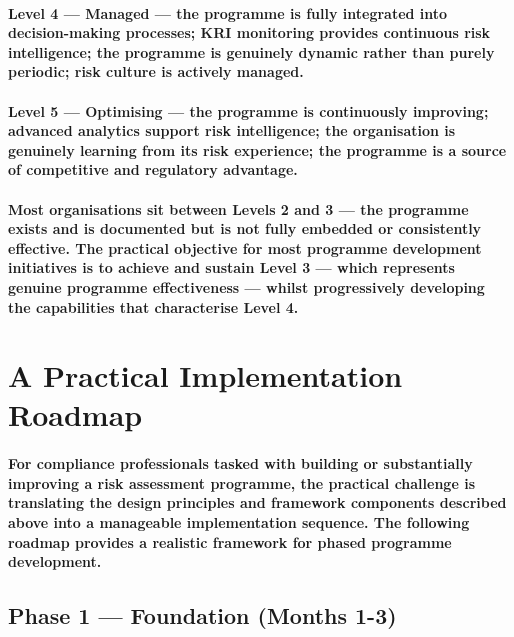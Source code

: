 \paragraph{\textbf{Level 4 — Managed} — the programme is fully integrated into decision-making processes; KRI monitoring provides continuous risk intelligence; the programme is genuinely dynamic rather than purely periodic; risk culture is actively managed.}
\paragraph{\textbf{Level 5 — Optimising} — the programme is continuously improving; advanced analytics support risk intelligence; the organisation is genuinely learning from its risk experience; the programme is a source of competitive and regulatory advantage.}
\paragraph{Most organisations sit between Levels 2 and 3 — the programme exists and is documented but is not fully embedded or consistently effective. The practical objective for most programme development initiatives is to achieve and sustain Level 3 — which represents genuine programme effectiveness — whilst progressively developing the capabilities that characterise Level 4.}

\section{A Practical Implementation Roadmap}
\paragraph{For compliance professionals tasked with building or substantially improving a risk assessment programme, the practical challenge is translating the design principles and framework components described above into a manageable implementation sequence. The following roadmap provides a realistic framework for phased programme development.}

\subsection{Phase 1 — Foundation (Months 1-3)}
